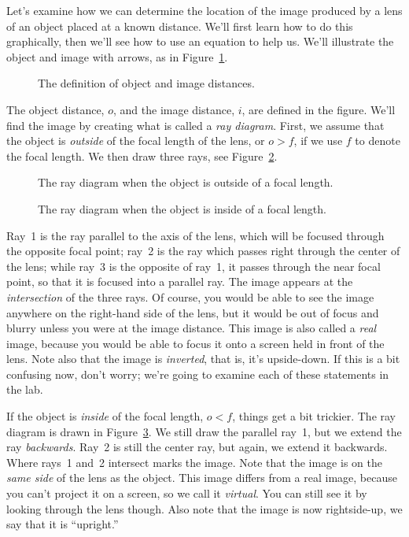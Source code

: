Let's examine how we can determine the location of the image produced by a 
lens of an object placed at a known distance.  We'll first learn how to do 
this graphically, then we'll see how to use an equation to help us.  We'll 
illustrate the object and image with arrows, as in 
Figure~\ref{fig:opt:objandim}.
\begin{figure}
\centerline{\epsfxsize=11cm }
\caption{The definition of object and image distances.}
\label{fig:opt:objandim}
\end{figure}
The object distance, $o$, and the image distance, $i$, are defined in the 
figure.  We'll find the image by creating what is called a {\it ray diagram}.
First, we assume that the object is {\it outside} of the focal length of the
lens, or $o>f$, if we use $f$ to denote the focal length. We then draw three
rays, see Figure~\ref{fig:opt:outsidef}.   
\begin{figure}
\centerline{\epsfxsize=13cm }
\caption{The ray diagram when the object is outside of a focal length.}
\label{fig:opt:outsidef}
\end{figure}
\begin{figure}
\centerline{\epsfxsize=13cm }
\caption{The ray diagram when the object is inside of a focal length.}
\label{fig:opt:insidef}
\end{figure}

Ray~1 is the ray parallel to the axis of the lens, which will be focused 
through the opposite focal point; ray~2 is the ray which passes right through 
the center of the lens; while ray~3 is the opposite of ray~1, it passes through
the near focal point, so that it is focused into a parallel ray.  The image
appears at the {\it intersection} of the three rays.  Of course, you would be 
able to see the image anywhere on the right-hand side of the lens, but it would
be out of focus and blurry unless you were at the image distance.  This image 
is also called a {\it real} image, because you would be able to focus it onto 
a screen held in front of the lens.  Note also that the image is 
{\it inverted}, that is, it's upside-down. If this is a bit confusing now, 
don't worry; we're going to examine each of these statements in the lab.

If the object is {\it inside} of the focal length, $o<f$, things get a bit 
trickier.  The ray diagram is drawn in Figure~\ref{fig:opt:insidef}.
We still draw the parallel ray~1, but we extend the ray {\it backwards}. 
Ray~2 is still the center ray, but again, we extend it backwards.  Where rays~1
and~2 intersect marks the image. Note that the image is on the {\it same side}
of the lens as the object. This image differs from a real image, because
you can't project it on a screen, so we call it {\it virtual}.  You can still
see it by looking through the lens though. Also note that the image is now
rightside-up, we say that it is ``upright.'' 


